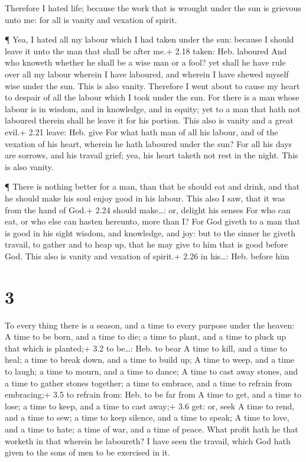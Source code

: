  Therefore I hated life; because the work that is wrought
under the sun is grievous unto me: for all is vanity and vexation of
spirit.

 ¶ Yea, I hated all my labour which I had taken under the
sun: because I should leave it unto the man that shall be after me.+
2.18 taken: Heb. laboured  And who knoweth whether he shall
be a wise man or a fool? yet shall he have rule over all my labour
wherein I have laboured, and wherein I have shewed myself wise under the
sun. This is also vanity.  Therefore I went about to cause
my heart to despair of all the labour which I took under the sun.
 For there is a man whose labour is in wisdom, and in
knowledge, and in equity; yet to a man that hath not laboured therein
shall he leave it for his portion. This also is vanity and a great
evil.+ 2.21 leave: Heb. give  For what hath man of all his
labour, and of the vexation of his heart, wherein he hath laboured under
the sun?  For all his days are sorrows, and his travail
grief; yea, his heart taketh not rest in the night. This is also vanity.

 ¶ There is nothing better for a man, than that he should
eat and drink, and that he should make his soul enjoy good in his
labour. This also I saw, that it was from the hand of God.+ 2.24 should
make\ldots: or, delight his senses  For who can eat, or who
else can hasten hereunto, more than I?  For God giveth to a
man that is good in his sight wisdom, and knowledge, and joy: but to the
sinner he giveth travail, to gather and to heap up, that he may give to
him that is good before God. This also is vanity and vexation of
spirit.+ 2.26 in his\ldots: Heb. before him

\hypertarget{section-2}{%
\section{3}\label{section-2}}

 To every thing there is a season, and a time to every
purpose under the heaven:  A time to be born, and a time to
die; a time to plant, and a time to pluck up that which is planted;+ 3.2
to be\ldots: Heb. to bear  A time to kill, and a time to
heal; a time to break down, and a time to build up;  A time
to weep, and a time to laugh; a time to mourn, and a time to dance;
 A time to cast away stones, and a time to gather stones
together; a time to embrace, and a time to refrain from embracing;+ 3.5
to refrain from: Heb. to be far from  A time to get, and a
time to lose; a time to keep, and a time to cast away;+ 3.6 get: or,
seek  A time to rend, and a time to sew; a time to keep
silence, and a time to speak;  A time to love, and a time to
hate; a time of war, and a time of peace.  What profit hath
he that worketh in that wherein he laboureth?  I have seen
the travail, which God hath given to the sons of men to be exercised in
it.

